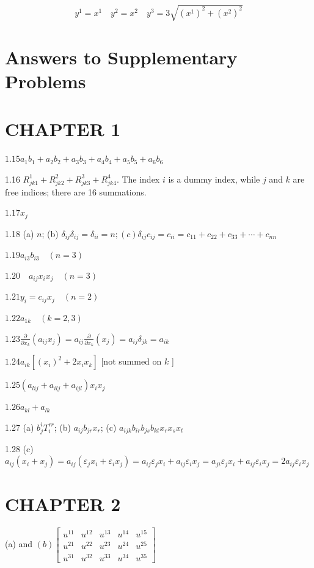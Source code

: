 \documentclass[10pt]{article}
\begin{document}
$$
y^{1}=x^{1} \quad y^{2}=x^{2} \quad y^{3}=3 \sqrt{\left(x^{1}\right)^{2}+\left(x^{2}\right)^{2}}
$$

\section*{Answers to Supplementary Problems}
\section*{CHAPTER 1}
$1.15 a_{1} b_{1}+a_{2} b_{2}+a_{3} b_{3}+a_{4} b_{4}+a_{5} b_{5}+a_{6} b_{6}$

1.16 $R_{j k 1}^{1}+R_{j k 2}^{2}+R_{j k 3}^{3}+R_{j k 4}^{4}$. The index $i$ is a dummy index, while $j$ and $k$ are free indices; there are 16 summations.

$1.17 x_{j}$

1.18 (a) $n$; (b) $\delta_{i j} \delta_{i j}=\delta_{i i}=n ;(c) \delta_{i j} c_{i j}=c_{i i}=c_{11}+c_{22}+c_{33}+\cdots+c_{n n}$

$1.19 a_{i 3} b_{i 3} \quad(n=3)$

$1.20 \quad a_{i j} x_{i} x_{j} \quad(n=3)$

$1.21 y_{i}=c_{i j} x_{j} \quad(n=2)$

$1.22 a_{1 k} \quad(k=2,3)$

$1.23 \frac{\partial}{\partial x_{k}}\left(a_{i j} x_{j}\right)=a_{i j} \frac{\partial}{\partial x_{k}}\left(x_{j}\right)=a_{i j} \delta_{j k}=a_{i k}$

$1.24 a_{i k}\left[\left(x_{i}\right)^{2}+2 x_{i} x_{k}\right]$ [not summed on $k$ ]

$1.25\left(a_{l i j}+a_{i l j}+a_{i j l}\right) x_{i} x_{j}$

$1.26 a_{k l}+a_{l k}$

1.27 (a) $b_{j}^{i} T_{i}^{r r}$; (b) $a_{i j} b_{j r} x_{r}$; (c) $a_{i j k} b_{i r} b_{j s} b_{k t} x_{r} x_{s} x_{t}$

1.28 (c) $a_{i j}\left(x_{i}+x_{j}\right)=a_{i j}\left(\varepsilon_{j} x_{i}+\varepsilon_{i} x_{j}\right)=a_{i j} \varepsilon_{j} x_{i}+a_{i j} \varepsilon_{i} x_{j}=a_{j i} \varepsilon_{j} x_{i}+a_{i j} \varepsilon_{i} x_{j}=2 a_{i j} \varepsilon_{i} x_{j}$

\section*{CHAPTER 2}
(a) and $(b)\left[\begin{array}{lllll}u^{11} & u^{12} & u^{13} & u^{14} & u^{15} \\ u^{21} & u^{22} & u^{23} & u^{24} & u^{25} \\ u^{31} & u^{32} & u^{33} & u^{34} & u^{35}\end{array}\right]$
\end{document}
